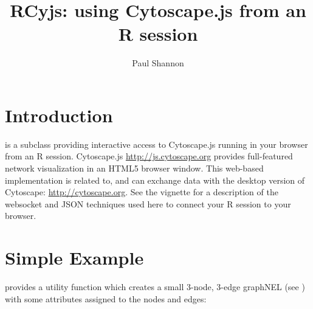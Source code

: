 \documentclass{article}
\title{RCyjs: using Cytoscape.js from an R session}
\author{Paul Shannon}
\begin{document}
\maketitle

\tableofcontents

\section{Introduction}

 is a  subclass providing interactive access to Cytoscape.js running in your
browser from an R session.  Cytoscape.js \url{http://js.cytoscape.org} provides full-featured network visualization in an HTML5
browser window.  This web-based implementation is related to, and can exchange data with the
desktop version of Cytoscape: \url{http://cytoscape.org}.    See the  vignette for
a description of the websocket and JSON techniques used here to connect your R session to your browser.

\section{Simple Example}

 provides a utility function which creates a small 3-node, 3-edge graphNEL (see )
with some attributes assigned to the nodes and edges:
\end{document}
